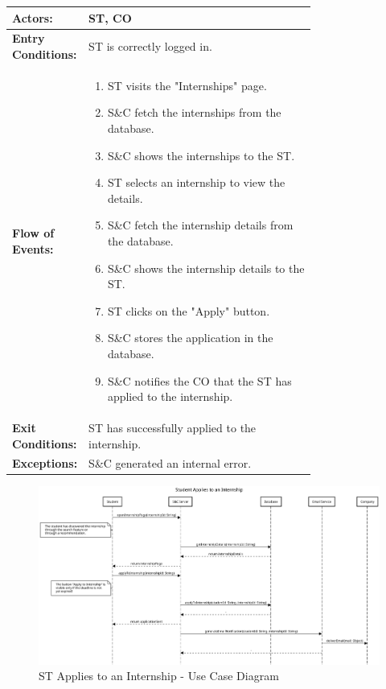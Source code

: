 \begin{center}
    \begin{longtable}{|l|p{0.75\linewidth}|}
        \hline
        \textbf{Actors:}           & ST, CO                                                               \\
        \hline
        \textbf{Entry Conditions:} & ST is correctly logged in.                                           \\
        \hline
        \textbf{Flow of Events:}   & \begin{enumerate}
                                         \item ST visits the "Internships" page.
                                         \item S\&C fetch the internships from the database.
                                         \item S\&C shows the internships to the ST.
                                         \item ST selects an internship to view the details.
                                         \item S\&C fetch the internship details from the database.
                                         \item S\&C shows the internship details to the ST.
                                         \item ST clicks on the "Apply" button.
                                         \item S\&C stores the application in the database.
                                         \item S\&C notifies the CO that the ST has applied to the internship.
                                     \end{enumerate} \\
        \hline
        \textbf{Exit Conditions:}  & ST has successfully applied to the internship.                       \\
        \hline
        \textbf{Exceptions:}       & S\&C generated an internal error.                                    \\
        \hline
    \end{longtable}
\end{center}

\begin{figure}[H]
    \centering
    \includegraphics[width=1.0\textwidth]{Images/UC_4.pdf}
    \caption{ST Applies to an Internship - Use Case Diagram}
    \label{fig:use-case-diagram-4}
\end{figure}

